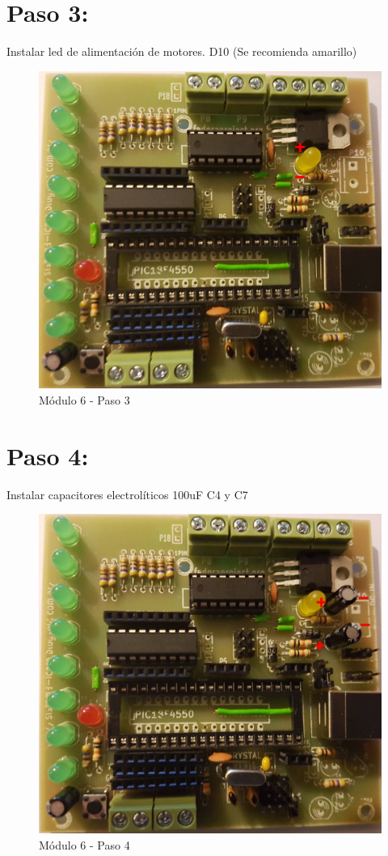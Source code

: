 \newpage

\section{Paso 3:}

Instalar led de alimentación de motores. D10 (Se recomienda amarillo)

\begin{figure}[h]
	\centering
	\includegraphics[width=0.8\linewidth]{Modulo_6/M6_3}
	\caption{Módulo 6 - Paso 3}
	\label{fig:M6_3}
\end{figure}

\newpage

\section{Paso 4:}

Instalar capacitores electrolíticos 100uF C4 y C7

\begin{figure}[h]
	\centering
	\includegraphics[width=0.8\linewidth]{Modulo_6/M6_4}
	\caption{Módulo 6 - Paso 4}
	\label{fig:M6_4}
\end{figure}

